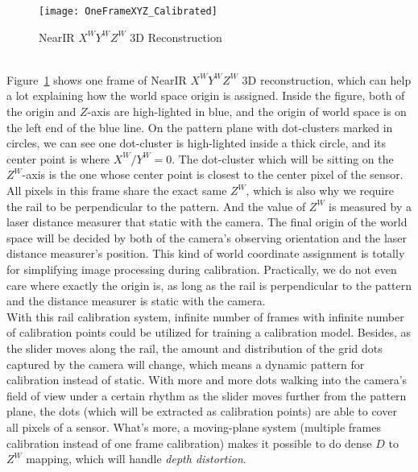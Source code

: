 %
\begin{figure}[!t]
\centering
\texttt{[image: OneFrameXYZ\_Calibrated]}
\caption{NearIR \(X^{W}Y^{W}Z^{W}\) 3D Reconstruction}
\label{OneFrameXYZ_Calibrated}
\end{figure}%
%
\\\indent
Figure~\ref{OneFrameXYZ_Calibrated} shows one frame of NearIR \(X^WY^WZ^W\) 3D reconstruction, which can help a lot explaining how the world space origin is assigned. Inside the figure, both of the origin and \(Z\)-axis are high-lighted in blue, and the origin of world space is on the left end of the blue line. On the pattern plane with dot-clusters marked in circles, we can see one dot-cluster is high-lighted inside a thick circle, and its center point is where \(X^W/Y^W = 0\). The dot-cluster which will be sitting on the \(Z^W\)-axis is the one whose center point is closest to the center pixel of the sensor. All pixels in this frame share the exact same \(Z^W\), which is also why we require the rail to be perpendicular to the pattern. And the value of \(Z^W\) is measured by a laser distance measurer that static with the camera. The final origin of the world space will be decided by both of the camera's observing orientation and the laser distance measurer's position. This kind of world coordinate assignment is totally for simplifying image processing during calibration.  Practically, we do not even care where exactly the origin is, as long as the rail is perpendicular to the pattern and the distance measurer is static with the camera.
\\\indent
With this rail calibration system, infinite number of frames with infinite number of calibration points could be utilized for training a calibration model. Besides, as the slider moves along the rail, the amount and distribution of the grid dots captured by the camera will change, which means a dynamic pattern for calibration instead of static. With more and more dots walking into the camera's field of view under a certain rhythm as the slider moves further from the pattern plane, the dots (which will be extracted as calibration points) are able to cover all pixels of a sensor. What's more, a moving-plane system (multiple frames calibration instead of one frame calibration) makes it possible to do dense \(D\) to \(Z^W\) mapping, which will handle \emph{depth distortion}.


